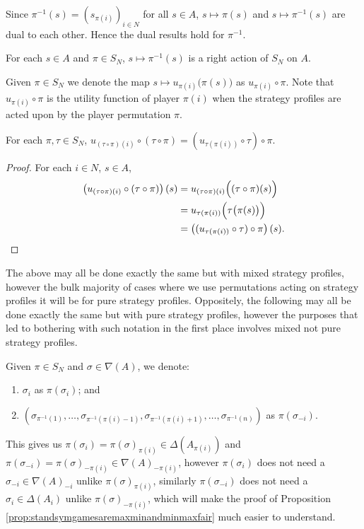 Since $\pi^{-1}(s) = (s_{\pi(i)})_{i \in N}$ for all $s \in A$, $s \mapsto \pi(s)$ and $s \mapsto \pi^{-1}(s)$ are dual to each other. Hence the dual results hold for $\pi^{-1}$.

\begin{lemma} 
	For each $s \in A$ and $\pi \in S_N$, $s \mapsto \pi^{-1}(s)$ is a right action of $S_N$ on $A$.
\end{lemma}

Given $\pi \in S_N$ we denote the map $s \mapsto u_{\pi(i)}\bigl(\pi(s)\bigr)$ as $u_{\pi(i)} \circ \pi$. Note that $u_{\pi(i)} \circ \pi$ is the utility function of player $\pi(i)$ when the strategy profiles are acted upon by the player permutation $\pi$.

\begin{corollary} \label{utilityactionprop}
	For each $\pi, \tau \in S_N$, $u_{(\tau \circ \pi)(i)} \circ (\tau \circ \pi) = (u_{\tau(\pi(i))} \circ \tau) \circ \pi$.
	\begin{proof}
		For each $i \in N$, $s \in A$, 
		\begin{align*}
			\left(u_{(\tau \circ \pi)(i)} \circ (\tau \circ \pi)\right)(s) &= u_{(\tau \circ \pi)(i)}\Bigl((\tau \circ \pi)(s)\Bigr) \\
			&= u_{\tau(\pi(i))}\Bigl(\tau\bigl(\pi(s)\bigr)\Bigr) \\
			&= \left((u_{\tau(\pi(i))} \circ \tau) \circ \pi\right)(s).
		\end{align*}
	\end{proof}
\end{corollary}

The above may all be done exactly the same but with mixed strategy profiles, however the bulk majority of cases where we use permutations acting on strategy profiles it will be for pure strategy profiles. Oppositely, the following may all be done exactly the same but with pure strategy profiles, however the purposes that led to bothering with such notation in the first place involves mixed not pure strategy profiles. 

Given $\pi \in S_N$ and $\sigma \in \nabla(A)$, we denote:
\begin{enumerate}
	\item $\sigma_i$ as $\pi(\sigma_i)$; and
	\item $(\sigma_{\pi^{-1}(1)}, \ldots, \sigma_{\pi^{-1}\left(\pi(i)-1\right)}, \sigma_{\pi^{-1}\left(\pi(i)+1\right)}, \ldots, \sigma_{\pi^{-1}(n)})$ as $\pi(\sigma_{-i})$.
\end{enumerate}
This gives us $\pi(\sigma_i) = \pi(\sigma)_{\pi(i)} \in \Delta(A_{\pi(i)})$ and $\pi(\sigma_{-i}) = \pi(\sigma)_{-\pi(i)} \in {\nabla(A)}_{-\pi(i)}$, however $\pi(\sigma_i)$ does not need a $\sigma_{-i} \in {\nabla(A)}_{-i}$ unlike $\pi(\sigma)_{\pi(i)}$, similarly $\pi(\sigma_{-i})$ does not need a $\sigma_i \in \Delta(A_i)$ unlike $\pi(\sigma)_{-\pi(i)}$, which will make the proof of Proposition \ref{prop:standsymgamesaremaxminandminmaxfair} much easier to understand.

